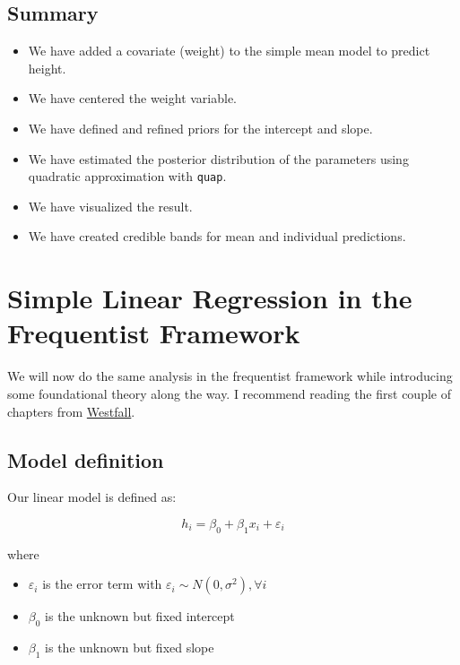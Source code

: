 \documentclass[
]{book}
\providecommand{\tightlist}{%
  \setlength{\itemsep}{0pt}\setlength{\parskip}{0pt}}
\begin{document}
\subsection{Summary}\label{summary}

\begin{itemize}
\tightlist
\item
  We have added a covariate (weight) to the simple mean model to predict height.
\item
  We have centered the weight variable.
\item
  We have defined and refined priors for the intercept and slope.
\item
  We have estimated the posterior distribution of the parameters using quadratic approximation with \texttt{quap}.
\item
  We have visualized the result.
\item
  We have created credible bands for mean and individual predictions.
\end{itemize}

\section{Simple Linear Regression in the Frequentist Framework}\label{simple-linear-regression-in-the-frequentist-framework}

We will now do the same analysis in the frequentist framework while introducing
some foundational theory along the way.
I recommend reading the first couple of chapters from \href{https://www.routledge.com/Understanding-Regression-Analysis-A-Conditional-Distribution-Approach/Westfall-Arias/p/book/9780367493516?srsltid=AfmBOore3O_Ciecl0TTkr9AjPIY1d6OmbQa7o7IAdKpTSkD8s9HkwzD4}{Westfall}.

\subsection{Model definition}\label{model-definition-1}

Our linear model is defined as:

\[ h_i = \beta_0 + \beta_1 x_i + \varepsilon_i \]

where

\begin{itemize}
\tightlist
\item
  \(\varepsilon_i\) is the error term with \(\varepsilon_i \sim N(0, \sigma^2), \forall i\)
\item
  \(\beta_0\) is the unknown but fixed intercept
\item
  \(\beta_1\) is the unknown but fixed slope
\end{itemize}
\end{document}
